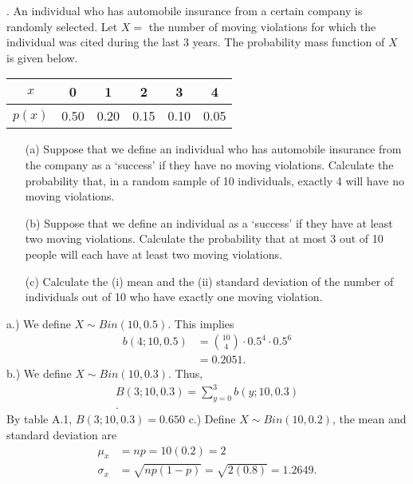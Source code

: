 \documentclass{report}
\begin{document}
 

 \pagebreak \bigbreak \noindent 
 \begin{mdframed}
     . An individual who has automobile insurance from a certain company is randomly selected. Let \( X = \) the number of moving violations for which the individual was cited during the last 3 years. The probability mass function of \( X \) is given below.

     \begin{center}
         \begin{tabular}{|c|c|c|c|c|c|}
             \hline
             \( x \) & 0 & 1 & 2 & 3 & 4 \\
             \hline
             \( p(x) \) & 0.50 & 0.20 & 0.15 & 0.10 & 0.05 \\
             \hline
         \end{tabular}
     \end{center}
     \begin{itemize}
         \item[(a)] Suppose that we define an individual who has automobile insurance from the company as a ‘success’ if they have no moving violations. Calculate the probability that, in a random sample of 10 individuals, exactly 4 will have no moving violations.
         \item[(b)] Suppose that we define an individual as a ‘success’ if they have at least two moving violations. Calculate the probability that at most 3 out of 10 people will each have at least two moving violations.
         \item[(c)] Calculate the (i) mean and the (ii) standard deviation of the number of individuals out of 10 who have exactly one moving violation.
     \end{itemize}
 \end{mdframed}
 \bigbreak \noindent 
 a.) We define $X \sim Bin(10, 0.5)$. This implies
 \begin{align*}
     b(4; 10,0.5) &= \binom{10}{4} \cdot 0.5^{4} \cdot 0.5^{6} \\
     &=0.2051
 .\end{align*}
 \bigbreak \noindent 
 b.) We define $X\sim Bin(10,0.3)$. Thus,
 \begin{align*}
     B(3;10,0.3) = \sum_{y=0}^{3}b(y;10,0.3) \\
 .\end{align*}
 By table A.1, $B(3;10,0.3) = 0.650$
 \bigbreak \noindent 
 c.) Define $X \sim Bin(10,0.2)$, the mean and standard deviation are
 \begin{align*}
     \mu_{x} &= np = 10(0.2) =2\\
     \sigma_{x} &= \sqrt{np(1-p)} = \sqrt{2(0.8)} = 1.2649
 .\end{align*}




 
\end{document}
